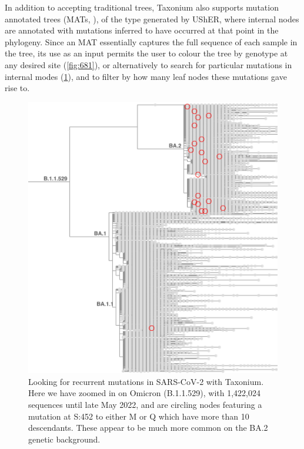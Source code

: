 In addition to accepting traditional trees, Taxonium also supports mutation annotated trees (MATs, \citet{matutils}), of the type generated by UShER, where internal nodes are annotated with mutations inferred to have occurred at that point in the phylogeny. Since an MAT essentially captures the full sequence of each sample in the tree, its use as an input permits the user to colour the tree by genotype at any desired site (\cref{fig:681}), or alternatively to search for particular mutations in internal modes (\cref{fig:452}), and to filter by how many leaf nodes these mutations gave rise to.



\begin{figure}
\begin{center}
\includegraphics[width=\linewidth]{Figures/452_2.png}
\end{center}
\caption{Looking for recurrent mutations in SARS-CoV-2 with Taxonium. Here we have zoomed in on Omicron (B.1.1.529), with 1,422,024 sequences until late May 2022, and are circling nodes featuring a mutation at S:452 to either M or Q which have more than 10 descendants. These appear to be much more common on the BA.2 genetic background.}
\label{fig:452}
\end{figure}

